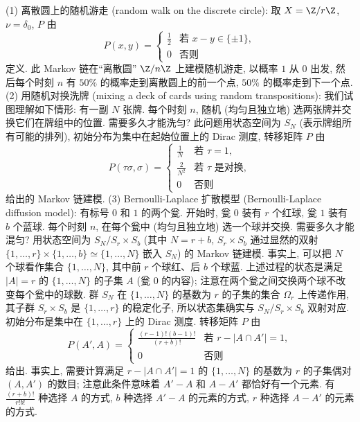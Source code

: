 \begin{example}
\label{exa:VI.1.5}
(1) 离散圆上的随机游走 (random walk on the discrete circle): 取 $X = \Z/r\Z$, $\nu = \delta_0$, $P$ 由
\[
P(x, y) = \begin{cases} \frac{1}{2} & \text{若 } x - y \in \{\pm 1\}, \\ 0 & \text{否则} \end{cases}
\]
定义. 此 Markov 链在``离散圆'' $\Z/n\Z$ 上建模随机游走, 以概率 $1$ 从 $0$ 出发, 然后每个时刻 $n$ 有 $50\%$ 的概率走到离散圆上的前一个点, $50\%$ 的概率走到下一个点.
(2) 用随机对换洗牌 (mixing a deck of cards using random transpositions): 我们试图理解如下情形: 有一副 $N$ 张牌. 每个时刻 $n$, 随机 (均匀且独立地) 选两张牌并交换它们在牌组中的位置. 需要多久才能洗匀?
此问题用状态空间为 $S_N$ (表示牌组所有可能的排列), 初始分布为集中在起始位置上的 Dirac 测度, 转移矩阵 $P$ 由
\[
P(\tau\sigma, \sigma) = \begin{cases} \frac{1}{N} & \text{若 } \tau = 1, \\ \frac{2}{N^2} & \text{若 } \tau \text{ 是对换}, \\ 0 & \text{否则} \end{cases}
\]
给出的 Markov 链建模.
(3) Bernoulli-Laplace 扩散模型 (Bernoulli-Laplace diffusion model): 有标号 $0$ 和 $1$ 的两个瓮. 开始时, 瓮 $0$ 装有 $r$ 个红球, 瓮 $1$ 装有 $b$ 个蓝球. 每个时刻 $n$, 在每个瓮中 (均匀且独立地) 选一个球并交换. 需要多久才能混匀?
用状态空间为 $S_N/S_r \times S_b$ (其中 $N = r + b$, $S_r \times S_b$ 通过显然的双射 $\{1, \ldots, r\} \times \{1, \ldots, b\} \simeq \{1, \ldots, N\}$ 嵌入 $S_N$) 的 Markov 链建模. 事实上, 可以把 $N$ 个球看作集合 $\{1, \ldots, N\}$, 其中前 $r$ 个球红、后 $b$ 个球蓝. 上述过程的状态是满足 $|A| = r$ 的 $\{1, \ldots, N\}$ 的子集 $A$ (瓮 $0$ 的内容); 注意在两个瓮之间交换两个球不改变每个瓮中的球数. 群 $S_N$ 在 $\{1, \ldots, N\}$ 的基数为 $r$ 的子集的集合 $\Omega_r$ 上传递作用, 其子群 $S_r \times S_b$ 是 $\{1, \ldots, r\}$ 的稳定化子, 所以状态集确实与 $S_N/S_r \times S_b$ 双射对应. 初始分布是集中在 $\{1, \ldots, r\}$ 上的 Dirac 测度. 转移矩阵 $P$ 由
\[
P(A', A) = \begin{cases} \frac{(r-1)!(b-1)!}{(r+b)!} & \text{若 } r - |A \cap A'| = 1, \\ 0 & \text{否则} \end{cases}
\]
给出. 事实上, 需要计算满足 $r - |A \cap A'| = 1$ 的 $\{1, \ldots, N\}$ 的基数为 $r$ 的子集偶对 $(A, A')$ 的数目; 注意此条件意味着 $A' - A$ 和 $A - A'$ 都恰好有一个元素. 有 $\frac{(r+b)!}{r!b!}$ 种选择 $A$ 的方式, $b$ 种选择 $A' - A$ 的元素的方式, $r$ 种选择 $A - A'$ 的元素的方式.
\end{example}

